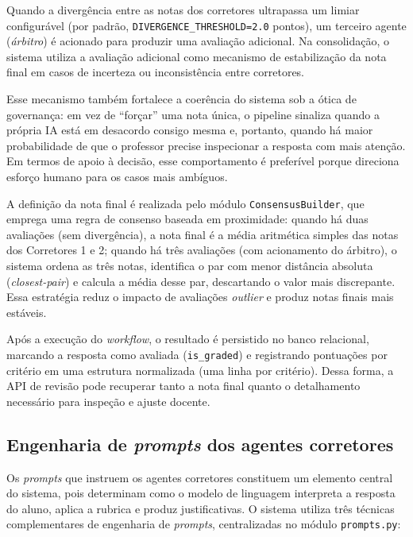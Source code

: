 Quando a divergência entre as notas dos corretores ultrapassa um limiar configurável (por padrão, \texttt{DIVERGENCE\_THRESHOLD=2.0} pontos), um terceiro agente (\textit{árbitro}) é acionado para produzir uma avaliação adicional. Na consolidação, o sistema utiliza a avaliação adicional como mecanismo de estabilização da nota final em casos de incerteza ou inconsistência entre corretores.

Esse mecanismo também fortalece a coerência do sistema sob a ótica de governança: em vez de “forçar” uma nota única, o pipeline sinaliza quando a própria IA está em desacordo consigo mesma e, portanto, quando há maior probabilidade de que o professor precise inspecionar a resposta com mais atenção. Em termos de apoio à decisão, esse comportamento é preferível porque direciona esforço humano para os casos mais ambíguos.

A definição da nota final é realizada pelo módulo \texttt{ConsensusBuilder}, que emprega uma regra de consenso baseada em proximidade: quando há duas avaliações (sem divergência), a nota final é a média aritmética simples das notas dos Corretores 1 e 2; quando há três avaliações (com acionamento do árbitro), o sistema ordena as três notas, identifica o par com menor distância absoluta (\textit{closest-pair}) e calcula a média desse par, descartando o valor mais discrepante. Essa estratégia reduz o impacto de avaliações \textit{outlier} e produz notas finais mais estáveis.

Após a execução do \textit{workflow}, o resultado é persistido no banco relacional, marcando a resposta como avaliada (\texttt{is\_graded}) e registrando pontuações por critério em uma estrutura normalizada (uma linha por critério). Dessa forma, a API de revisão pode recuperar tanto a nota final quanto o detalhamento necessário para inspeção e ajuste docente.

\subsection{Engenharia de \textit{prompts} dos agentes corretores}

Os \textit{prompts} que instruem os agentes corretores constituem um elemento central do sistema, pois determinam como o modelo de linguagem interpreta a resposta do aluno, aplica a rubrica e produz justificativas. O sistema utiliza três técnicas complementares de engenharia de \textit{prompts}, centralizadas no módulo \texttt{prompts.py}:

